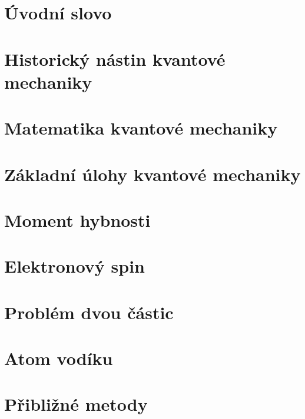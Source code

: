 \documentclass[a4paper,12pt]{article}
\numberwithin{equation}{section} %
\begin{document}
\section{Úvodní slovo}
\label{kap:uvod}


\clearpage
\section{Historický nástin kvantové mechaniky}
\label{kap:historie}


\clearpage
\section{Matematika kvantové mechaniky}
\label{kap:matematika}


\clearpage
\section{Základní úlohy kvantové mechaniky}
\label{kap:zakladniulohy}


\clearpage
\section{Moment hybnosti}
\label{kap:momenthybnosti}


\clearpage
\section{Elektronový spin}
\label{kap:elektronovyspin}


\clearpage
\section{Problém dvou částic}
\label{kap:dvecastice}


\clearpage
\section{Atom vodíku}
\label{kap:vodik}


\clearpage
\section{Přibližné metody}
\label{kap:pribliznemetody}

\end{document}
